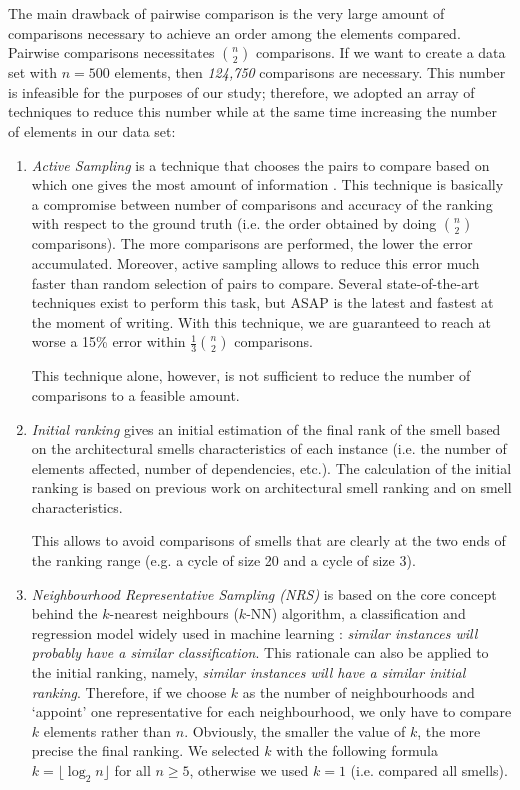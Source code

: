 The main drawback of pairwise comparison is the very large amount of comparisons necessary to achieve an order among the elements compared.
Pairwise comparisons necessitates $\binom{n}{2}$ comparisons. If we want to create a data set with $n = 500$ elements, then \emph{124,750} comparisons are necessary.
This number is infeasible for the purposes of our study; therefore, we adopted an array of techniques to reduce this number while at the same time increasing the number of elements in our data set:
\begin{enumerate}
    
    \item \emph{Active Sampling} is a technique that chooses the pairs to compare based on which one gives the most amount of information \cite{Mikhailiuk2020}. This technique is basically a compromise between number of comparisons and accuracy of the ranking with respect to the ground truth (i.e. the order obtained by doing $\binom{n}{2}$ comparisons). 
    The more comparisons are performed, the lower the error accumulated.
    Moreover, active sampling allows to reduce this error much faster than random selection of pairs to compare. 
    Several state-of-the-art techniques exist to perform this task, but ASAP \cite{Mikhailiuk2020} is the latest and fastest at the moment of writing.
    With this technique, we are guaranteed to reach at worse a 15\% error within $\frac{1}{3}\binom{n}{2}$ comparisons.
    
    This technique alone, however, is not sufficient to reduce the number of comparisons to a feasible amount.

    \item \emph{Initial ranking} gives an initial estimation of the final rank of the smell based on the architectural smells characteristics of each instance (i.e. the number of elements affected, number of dependencies, etc.). 
    The calculation of the initial ranking is based on previous work on architectural smell ranking \cite{Laval2012} and on smell characteristics.
    
    This allows to avoid comparisons of smells that are clearly at the two ends of the ranking range (e.g. a cycle of size 20 and a cycle of size 3).

    \item \emph{Neighbourhood Representative Sampling (NRS)} is based on the core concept behind the $k$-nearest neighbours ($k$-NN) algorithm, a classification and regression model widely used in machine learning \cite{Fix1989}: \emph{similar instances will probably have a similar classification}.
    This rationale can also be applied to the initial ranking, namely, \emph{similar instances will have a similar initial ranking}.
    Therefore, if we choose $k$ as the number of neighbourhoods and `appoint' one representative for each neighbourhood, we only have to compare $k$ elements rather than $n$.
    Obviously, the smaller the value of $k$, the more precise the final ranking.
    We selected $k$ with the following formula $k = \lfloor\log_2 n\rfloor$ for all $n \ge 5$, otherwise we used $k = 1$ (i.e. compared all smells).


\end{enumerate}
